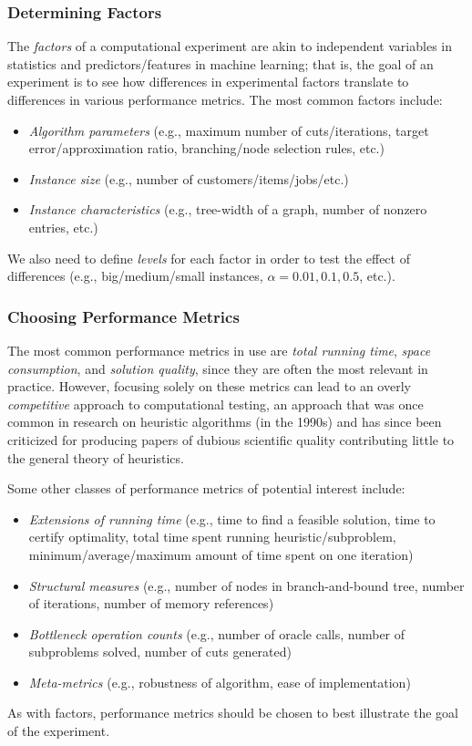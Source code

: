 \documentclass[12pt]{article}
\begin{document}
\subsubsection{Determining Factors}
The \emph{factors} of a computational experiment are akin to independent variables in statistics and predictors/features in machine learning; that is, the goal of an experiment is to see how differences in experimental factors translate to differences in various performance metrics. The most common factors include:
\begin{itemize}
    \item \emph{Algorithm parameters} (e.g., maximum number of cuts/iterations, target error/approximation ratio, branching/node selection rules, etc.)
    \item \emph{Instance size} (e.g., number of customers/items/jobs/etc.)
    \item \emph{Instance characteristics} (e.g., tree-width of a graph, number of nonzero entries, etc.)
\end{itemize}
We also need to define \emph{levels} for each factor in order to test the effect of differences (e.g., big/medium/small instances, $\alpha = 0.01, 0.1, 0.5$, etc.).

\subsubsection{Choosing Performance Metrics}
The most common performance metrics in use are \emph{total running time}, \emph{space consumption}, and \emph{solution quality}, since they are often the most relevant in practice. However, focusing solely on these metrics can lead to an overly \emph{competitive} approach to computational testing, an approach that was once common in research on heuristic algorithms (in the 1990s) and has since been criticized \cite{hooker1995testing,sorensen2015metaheuristics} for producing papers of dubious scientific quality contributing little to the general theory of heuristics.

Some other classes of performance metrics of potential interest include:
\begin{itemize}
    \item \emph{Extensions of running time} (e.g., time to find a feasible solution, time to certify optimality, total time spent running heuristic/subproblem, minimum/average/maximum amount of time spent on one iteration)
    \item \emph{Structural measures} (e.g., number of nodes in branch-and-bound tree, number of iterations, number of memory references)
    \item \emph{Bottleneck operation counts} (e.g., number of oracle calls, number of subproblems solved, number of cuts generated)
    \item \emph{Meta-metrics} (e.g., robustness of algorithm, ease of implementation)
\end{itemize}
As with factors, performance metrics should be chosen to best illustrate the goal of the experiment.
\end{document}
